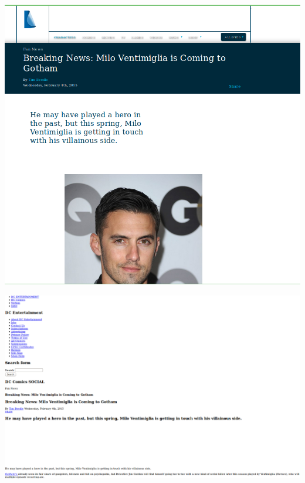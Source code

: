 \begin{minipage}{\linewidth}
	\includegraphics[scale=0.55]{figures/playback/webrecorder_24_webrecorder.PNG}
	\label{webrecorder_24_webrecorder}
\end{minipage}
\newpage
\begin{minipage}{\linewidth}
	\includegraphics[scale=0.55]{figures/playback/webrecorder_24_wget.PNG}
	\label{webrecorder_24_wget}
\end{minipage}
\newpage
